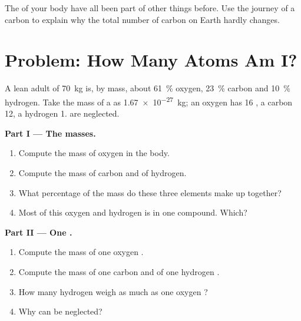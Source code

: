 \begin{exercise}[$\star\star\star$]\label{exo:g9:elements-universe-earth:12}
The  of your body have all been part of other things before. Use
the journey of a carbon  to explain why the total number of carbon
 on Earth hardly changes.
\end{exercise}

\section{Problem: How Many Atoms Am I?}

\begin{problem}
\label{pb:g9:elements-universe-earth:1}
A lean adult of \qty{70}{kg} is, by mass, about \qty{61}{\percent}
oxygen, \qty{23}{\percent} carbon and \qty{10}{\percent} hydrogen. Take
the mass of a  as \qty{1.67e-27}{kg}; an oxygen  has 16
, a carbon  12, a hydrogen  1.  are neglected.

\medskip
\noindent\textbf{Part I --- The masses.}
\begin{enumerate}
  \item Compute the mass of oxygen in the body.
  \item Compute the mass of carbon and of hydrogen.
  \item What percentage of the mass do these three elements make up
        together?
  \item Most of this oxygen and hydrogen is in one compound. Which?
\end{enumerate}

\medskip
\noindent\textbf{Part II --- One .}
\begin{enumerate}[resume]
  \item Compute the mass of one oxygen .
  \item Compute the mass of one carbon  and of one hydrogen .
  \item How many hydrogen  weigh as much as one oxygen ?
  \item Why can  be neglected?
\end{enumerate}


\end{problem}
